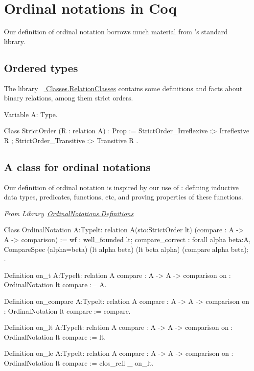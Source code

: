 \section{Ordinal notations in Coq}

Our definition of ordinal notation borrows much material from \coq's standard library.



\subsection{Ordered types}

The library ~\href{https://coq.inria.fr/distrib/current/stdlib/Coq.Classes.RelationClasses.html}{%
Classes.RelationClasses} contains some definitions and facts about binary relations, among them strict orders.

\begin{Coqsrc}
Variable A: Type.

  Class StrictOrder (R : relation A) : Prop := {
    StrictOrder_Irreflexive :> Irreflexive R ;
    StrictOrder_Transitive :> Transitive R }.
\end{Coqsrc}



\subsection{A class for ordinal notations}

Our definition of ordinal notation is inspired by our use of \coq{}: defining inductive data types, predicates, functions, etc, and proving properties of these functions. 

\vspace{4pt}
\noindent\emph{From Library~\href{../src/html/hydras.OrdinalNotations.Definitions.html}{OrdinalNotations.Definitions}}



\begin{Coqsrc}
Class OrdinalNotation {A:Type}{lt: relation A}(sto:StrictOrder lt)
      (compare : A -> A -> comparison)  :=
  {   wf : well_founded lt;
      compare_correct :
         forall alpha beta:A,
          CompareSpec (alpha=beta) (lt alpha beta) (lt beta alpha)
                                   (compare alpha beta);
  }. 


Definition on_t  {A:Type}{lt: relation A}
            {compare : A -> A -> comparison}
            {on : OrdinalNotation lt compare} := A.

Definition on_compare {A:Type}{lt: relation A}
            {compare : A -> A -> comparison}
            {on : OrdinalNotation lt compare} := compare.


Definition on_lt {A:Type}{lt: relation A}
           {compare : A -> A -> comparison}
           {on : OrdinalNotation lt compare} := lt.

Definition on_le  {A:Type}{lt: relation A}
           {compare : A -> A -> comparison}
           {on : OrdinalNotation lt compare} :=
  clos_refl _ on_lt.

\end{Coqsrc}





